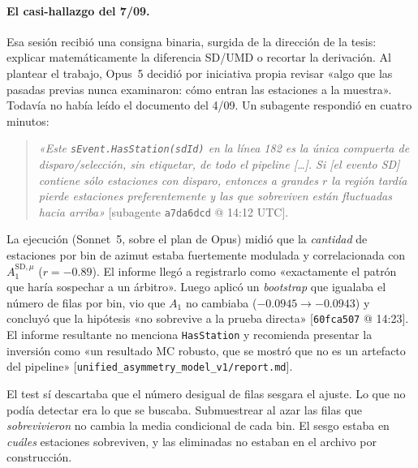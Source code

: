 \documentclass[11pt,a4paper]{article}
\newcommand{\ev}[1]{{\small\color{nota}[#1]}}   %
\newcommand{\code}[1]{\texttt{#1}}
\begin{document}
\paragraph{El casi-hallazgo del 7/09.} Esa sesión recibió una consigna binaria, surgida de la dirección de
la tesis: explicar matemáticamente la diferencia SD/UMD o recortar la derivación. Al plantear el trabajo,
Opus~5 decidió por iniciativa propia revisar «algo que las pasadas previas nunca examinaron: cómo entran las
estaciones a la muestra». Todavía no había leído el documento del 4/09. Un subagente respondió en cuatro
minutos:
\begin{quote}
\emph{«Este \code{sEvent.HasStation(sdId)} en la línea 182 es la única compuerta de disparo/selección, sin
etiquetar, de todo el pipeline [\ldots]. Si [el evento SD] contiene sólo estaciones con disparo, entonces a
grandes $r$ la región tardía pierde estaciones preferentemente y las que sobreviven están fluctuadas hacia
arriba»} \ev{subagente \code{a7da6dcd} @ 14:12 UTC}.
\end{quote}
La ejecución (Sonnet~5, sobre el plan de Opus) midió que la \emph{cantidad} de estaciones por bin de azimut
estaba fuertemente modulada y correlacionada con $A_1^{\mathrm{SD},\mu}$ ($r=-0.89$). El informe llegó a
registrarlo como «exactamente el patrón que haría sospechar a un árbitro». Luego aplicó un \emph{bootstrap}
que igualaba el número de filas por bin, vio que $A_1$ no cambiaba ($-0.0945\to-0.0943$) y concluyó que la
hipótesis «no sobrevive a la prueba directa» \ev{\code{60fca507} @ 14:23}. El informe resultante no
menciona \code{HasStation} y recomienda presentar la inversión como «un resultado MC robusto, que se mostró
que no es un artefacto del pipeline» \ev{\code{unified\_asymmetry\_model\_v1/report.md}}.

El test sí descartaba que el número desigual de filas sesgara el ajuste. Lo que no podía detectar era lo que
se buscaba. Submuestrear al azar las filas que \emph{sobrevivieron} no cambia la media condicional de cada
bin. El sesgo estaba en \emph{cuáles} estaciones sobreviven, y las eliminadas no estaban en el archivo por
construcción.
\end{document}
